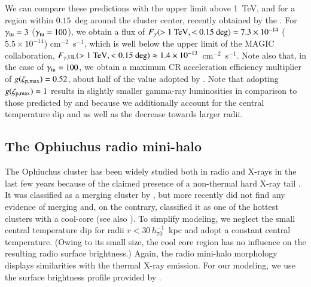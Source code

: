 \documentclass[useAMS,usenatbib]{mn2e}
\begin{document}
We can compare these predictions with the upper limit above 1~TeV, and for a
region within $0.15$~deg around the cluster center, recently obtained by the
\cite{2011arXiv1111.5544M}. For $\gamma_{{\mathrm{tu}}}=3$ ($\gamma_{{\mathrm{tu}}}=100$),
we obtain a flux of $F_{\gamma}(>1~{\mathrm{TeV}},<0.15~{\mathrm{deg}}) = 7.3 \times
10^{-14}$ ($5.5 \times 10^{-14}$) cm$^{-2}$~s$^{-1}$, which is well below the
upper limit of the MAGIC collaboration,
$F_{\gamma,{\mathrm{UL}}}(>1~{\mathrm{TeV}},<0.15~{\mathrm{deg}}) \approx 1.4 \times
10^{-13}$~cm$^{-2}$~s$^{-1}$. Note also that, in the case of $\gamma_{{\mathrm{tu}}}
= 100$, we obtain a maximum CR acceleration efficiency multiplier of
$g(\zeta_{{\mathrm{p,max}}})=0.52$, about half of the value adopted by
\cite{2010MNRAS.409..449P}. Note that adopting $g(\zeta_{{\mathrm{p,max}}})=1$
results in slightly smaller gamma-ray luminosities in comparison to those
predicted by \cite{2010MNRAS.409..449P} and \cite{2011arXiv1105.3240P} because
we additionally account for the central temperature dip and as well as the
decrease towards larger radii.


\subsection{The Ophiuchus radio mini-halo}

The Ophiuchus cluster has been widely studied both in radio and X-rays in the
last few years because of the claimed presence of a non-thermal hard X-ray tail
\citep{2008A&A...479...27E,2008PASJ...60.1133F,2009A&A...499..371G,
  2009A&A...499..679M,2009MNRAS.396.2237P,2009A&A...508.1161N,2010A&A...514A..76M,
  2010MNRAS.405.1624M}.  It was classified as a merging cluster by
\cite{2001PASJ...53..605W}, but more recently \cite{2008PASJ...60.1133F} did not
find any evidence of merging and, on the contrary, classified it as one of the
hottest clusters with a cool-core (see also \citealp{2010MNRAS.405.1624M}).  To
simplify modeling, we neglect the small central temperature dip for radii
$r<30\,h_{70}^{-1}$~kpc and adopt a constant central temperature. (Owing to its
small size, the cool core region has no influence on the resulting radio surface
brightness.) Again, the radio mini-halo morphology displays similarities with
the thermal X-ray emission. For our modeling, we use the surface brightness
profile provided by \cite{2009A&A...499..679M}.
\end{document}
